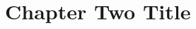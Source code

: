 \documentclass[../main.tex]{subfiles}
\begin{document}
\cleardoublepage
\chapter{Chapter Two Title}

\Blindtext
\end{document}
